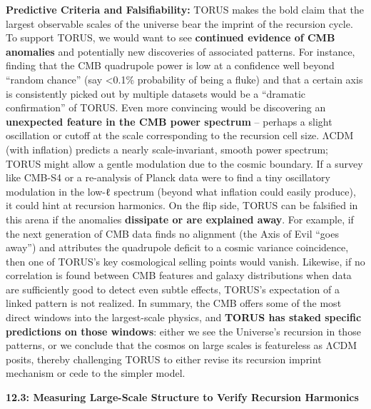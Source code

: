 \documentclass[
]{article}
\begin{document}
\textbf{Predictive Criteria and Falsifiability:} TORUS makes the bold
claim that the largest observable scales of the universe bear the
imprint of the recursion cycle. To support TORUS, we would want to see
\textbf{continued evidence of CMB anomalies} and potentially new
discoveries of associated patterns. For instance, finding that the CMB
quadrupole power is low at a confidence well beyond ``random chance''
(say \textless0.1\% probability of being a fluke) and that a certain
axis is consistently picked out by multiple datasets would be a
``dramatic confirmation'' of TORUS\hspace{0pt}. Even more convincing
would be discovering an \textbf{unexpected feature in the CMB power
spectrum} -- perhaps a slight oscillation or cutoff at the scale
corresponding to the recursion cell size. ΛCDM (with inflation) predicts
a nearly scale-invariant, smooth power spectrum; TORUS might allow a
gentle modulation due to the cosmic boundary. If a survey like CMB-S4 or
a re-analysis of Planck data were to find a tiny oscillatory modulation
in the low-ℓ spectrum (beyond what inflation could easily produce), it
could hint at recursion harmonics. On the flip side, TORUS can be
falsified in this arena if the anomalies \textbf{dissipate or are
explained away}. For example, if the next generation of CMB data finds
no alignment (the Axis of Evil ``goes away'') and attributes the
quadrupole deficit to a cosmic variance coincidence, then one of TORUS's
key cosmological selling points would vanish. Likewise, if no
correlation is found between CMB features and galaxy distributions when
data are sufficiently good to detect even subtle effects, TORUS's
expectation of a linked pattern is not realized. In summary, the CMB
offers some of the most direct windows into the largest-scale physics,
and \textbf{TORUS has staked specific predictions on those windows}:
either we see the Universe's recursion in those patterns, or we conclude
that the cosmos on large scales is featureless as ΛCDM posits, thereby
challenging TORUS to either revise its recursion imprint mechanism or
cede to the simpler model.

\textbf{12.3: Measuring Large-Scale Structure to Verify Recursion
Harmonics}
\end{document}

